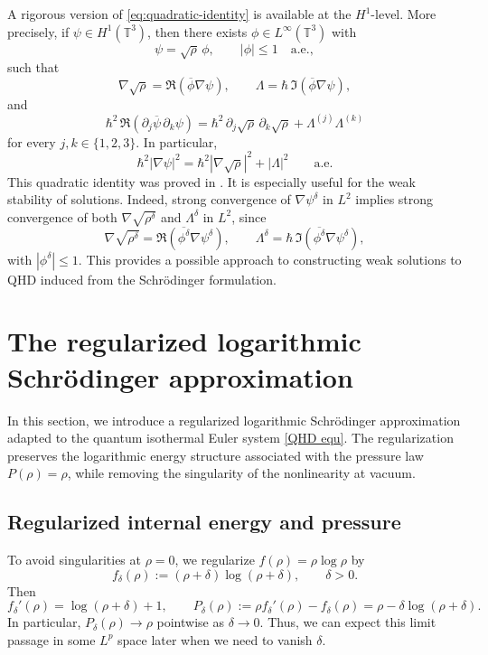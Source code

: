 \documentclass[11pt]{article}
\begin{document}
A rigorous version of \eqref{eq:quadratic-identity} is available at the \(H^1\)-level. More precisely, if \(\psi\in H^1(\mathbb{T}^3)\), then there exists \(\phi\in L^\infty(\mathbb{T}^3)\) with
\[
\psi=\sqrt{\rho}\,\phi,
\qquad |\phi|\le 1 \quad \text{a.e.},
\]
such that
\[
\nabla\sqrt{\rho}=\Re(\overline{\phi}\nabla\psi),
\qquad
\Lambda=\hbar\,\Im(\overline{\phi}\nabla\psi),
\]
and
\begin{equation}\label{eq:rigorous-quadratic-identity}
\hbar^2\,\Re(\partial_j\overline{\psi}\,\partial_k\psi)
=
\hbar^2\,\partial_j\sqrt{\rho}\,\partial_k\sqrt{\rho}
+
\Lambda^{(j)}\Lambda^{(k)}
\end{equation}
for every \(j,k\in\{1,2,3\}\). In particular,
\[
\hbar^2|\nabla\psi|^2=\hbar^2|\nabla\sqrt{\rho}|^2+|\Lambda|^2
\qquad\text{a.e.}
\]
This quadratic identity was proved in \cite{AntonelliMarcati2009}. 
It  is especially useful for the weak stability of solutions. Indeed, strong convergence of \(\nabla\psi^\delta\) in \(L^2\) implies strong convergence of both \(\nabla\sqrt{\rho^\delta}\) and \(\Lambda^\delta\) in \(L^2\), since
\[
\nabla\sqrt{\rho^\delta}
=
\Re(\overline{\phi^\delta}\nabla\psi^\delta),
\qquad
\Lambda^\delta
=
\hbar\,\Im(\overline{\phi^\delta}\nabla\psi^\delta),
\]
with \(|\phi^\delta|\le1\). This provides a possible approach to constructing weak solutions to QHD induced from the Schrödinger formulation.





\section{The regularized logarithmic Schr\"odinger approximation}

In this section, we introduce a regularized logarithmic Schr\"odinger approximation adapted to the quantum isothermal Euler system \eqref{QHD equ}. The regularization preserves the logarithmic energy structure associated with the pressure law \(P(\rho)=\rho\), while removing the singularity of the nonlinearity at vacuum.


\subsection{Regularized internal energy and pressure}
To avoid singularities at $\rho=0$, we regularize $f(\rho)=\rho\log\rho$ by
\begin{equation}\label{eq:fdelta}
f_\delta(\rho):=(\rho+\delta)\log(\rho+\delta),\qquad \delta>0.
\end{equation}
Then
\[
f_\delta'(\rho)=\log(\rho+\delta)+1,
\qquad
P_\delta(\rho):=\rho f_\delta'(\rho)-f_\delta(\rho)=\rho-\delta\log(\rho+\delta).
\]
In particular, $P_\delta(\rho)\to \rho$ pointwise as $\delta\to0$.  Thus, we can expect this limit passage  in some $L^p$ space later when we need to vanish $\delta$.
\end{document}
